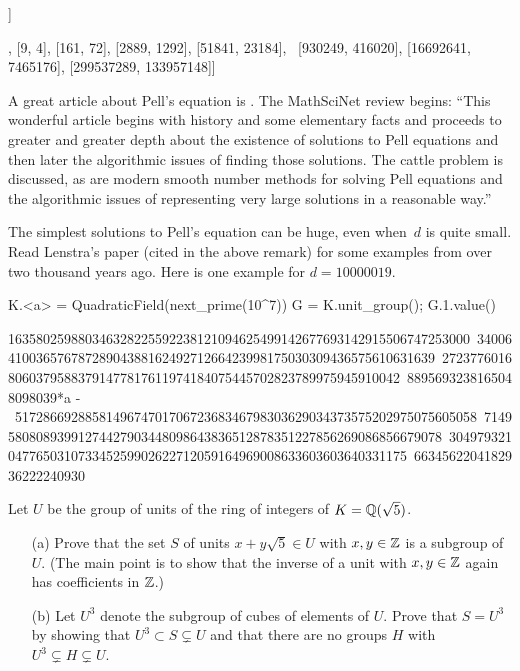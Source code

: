 \begin{sagecode} %
\begin{sagecell}
[list(u^(6*i)) for i in [0..7]]
\end{sagecell}
\begin{sageout}
[[1, 0], [9, 4], [161, 72], [2889, 1292], [51841, 23184], \
[930249, 416020], [16692641, 7465176], [299537289, 133957148]]
\end{sageout}
\end{sagecode}

\begin{remark}
	A great article about Pell's equation is \cite{lenstra:pell}.  The
	MathSciNet review begins: ``This wonderful article begins with history
	and some elementary facts and proceeds to greater and greater depth
	about the existence of solutions to Pell equations and then later the
	algorithmic issues of finding those solutions. The cattle problem is
	discussed, as are modern smooth number methods for solving Pell
	equations and the algorithmic issues of representing very large
	solutions in a reasonable way.''
\end{remark}

The simplest solutions to Pell's equation can be huge, even when~$d$
is quite small. Read Lenstra's paper (cited in the above remark)
for some examples from over two thousand years ago.
Here is one example for $d=10000019$.

\begin{sagecode}
\begin{sagecell}
K.<a> = QuadraticField(next_prime(10^7))
G = K.unit_group(); G.1.value()
\end{sagecell}
\begin{sageout}
163580259880346328225592238121094625499142677693142915506747253000\
340064100365767872890438816249271266423998175030309436575610631639\
272377601680603795883791477817611974184075445702823789975945910042\
8895693238165048098039*a - \
517286692885814967470170672368346798303629034373575202975075605058\
714958080893991274427903448098643836512878351227856269086856679078\
304979321047765031073345259902622712059164969008633603603640331175\
6634562204182936222240930
\end{sageout}
\end{sagecode}

\begin{exercise}
  Let $U$ be the group of units of the ring of integers
  of $K=\mathbb{Q}(\sqrt{5})$.
\begin{enumerate}
\item[(a)] Prove that the set $S$ of units $x+y\sqrt{5} \in U$ with
  $x,y\in\mathbb{Z}$ is a subgroup of $U$.  (The main point is to show that
  the inverse of a unit with $x,y\in\mathbb{Z}$ again has coefficients in
  $\mathbb{Z}$.)
\item[(b)] Let $U^3$ denote the subgroup of cubes of elements of $U$.
  Prove that $S=U^3$ by showing that $U^3\subset S \subsetneq U$ and
  that there are no groups $H$ with $U^3\subsetneq H \subsetneq U$.
\end{enumerate}
\end{exercise}

